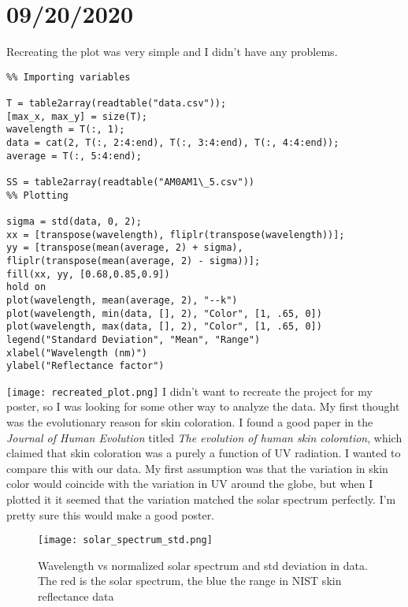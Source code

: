 \documentclass{article}
\begin{document}
    \section*{09/20/2020}
    Recreating the plot was very simple and I didn't have any problems.
    \begin{lstlisting}
%% Importing variables

T = table2array(readtable("data.csv"));
[max_x, max_y] = size(T);
wavelength = T(:, 1);
data = cat(2, T(:, 2:4:end), T(:, 3:4:end), T(:, 4:4:end));
average = T(:, 5:4:end);

SS = table2array(readtable("AM0AM1\_5.csv"))
%% Plotting

sigma = std(data, 0, 2);
xx = [transpose(wavelength), fliplr(transpose(wavelength))];
yy = [transpose(mean(average, 2) + sigma), fliplr(transpose(mean(average, 2) - sigma))];
fill(xx, yy, [0.68,0.85,0.9])
hold on
plot(wavelength, mean(average, 2), "--k")
plot(wavelength, min(data, [], 2), "Color", [1, .65, 0])
plot(wavelength, max(data, [], 2), "Color", [1, .65, 0])
legend("Standard Deviation", "Mean", "Range")
xlabel("Wavelength (nm)")
ylabel("Reflectance factor")
    \end{lstlisting}
    \texttt{[image: recreated\_plot.png]}
    I didn't want to recreate the project for my poster, so I was looking for some other way to analyze the data. My first thought was the evolutionary reason for skin coloration. I found a good paper in the \textit{Journal of Human Evolution} titled \textit{The evolution of human skin coloration}, which claimed that skin coloration was a purely a function of UV radiation. I wanted to compare this with our data. My first assumption was that the variation in skin color would coincide with the variation in UV around the globe, but when I plotted it it seemed that the variation matched the solar spectrum perfectly. I'm pretty sure this would make a good poster.
    \begin{figure}
        \centering
        \texttt{[image: solar\_spectrum\_std.png]}
        \caption{Wavelength vs normalized solar spectrum and std deviation in data. The red is the solar spectrum, the blue the range in NIST skin reflectance data}
    \end{figure}
\end{document}
